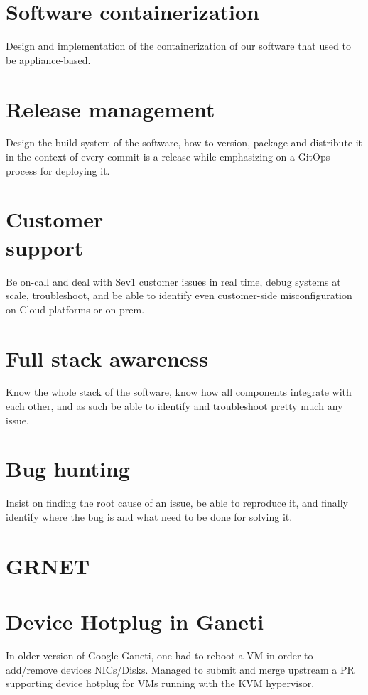 \documentclass[margin,centered]{res}
\begin{document}
\begin{resume}
\section{\sc Software containerization}
Design and implementation of the containerization of our software
that used to be appliance-based.

\section{\sc Release management}
Design the build system of the software, how to version, package and distribute
it in the context of every commit is a release while emphasizing on a GitOps
process for deploying it.

\section{\sc Customer\\support}
Be on-call and deal with Sev1 customer issues in real time, debug systems at
scale, troubleshoot, and be able to identify even customer-side
misconfiguration on Cloud platforms or on-prem.

\section{\sc Full stack awareness}
Know the whole stack of the software, know how all components integrate with
each other, and as such be able to identify and troubleshoot pretty much any
issue.

\section{\sc Bug hunting}
Insist on finding the root cause of an issue, be able to reproduce it, and
finally identify where the bug is and what need to be done for solving it.


\section{GRNET}

\section{\sc Device Hotplug in Ganeti}
In older version of Google Ganeti, one had to reboot a VM in order to
add/remove devices NICs/Disks. Managed to submit and merge upstream a PR
supporting device hotplug for VMs running with the KVM hypervisor.


\end{resume}
\end{document}
